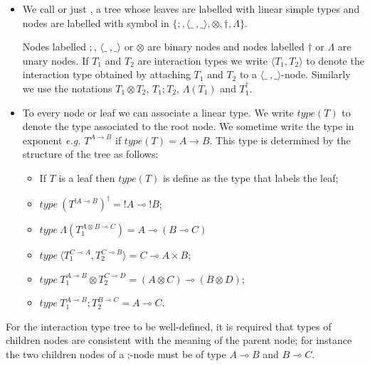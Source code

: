 \begin{definition} \hfill
\begin{itemize}
\item We call  or just ,
a tree whose leaves are labelled with linear simple types and
nodes are labelled with symbol in $\{ ;, \langle \_\ ,\_
\rangle, \otimes, \dagger, \Lambda \}$.


Nodes labelled $;$, $\langle \_\ ,\_ \rangle$ or $\otimes$ are
binary nodes and nodes labelled $\dagger$ or $\Lambda$ are unary
nodes. If $T_1$ and $T_2$ are interaction types we write
$\langle T_1, T_2 \rangle$ to denote the interaction type
obtained by attaching $T_1$ and $T_2$ to a $\langle \_\ ,\_
\rangle$-node. Similarly we use the notations $T_1 \otimes T_2$,
$T_1 ; T_2$, $\Lambda(T_1)$ and $T_1^\dagger$.

\item To every node or leaf we can associate a linear type. We write
    $type(T)$ to denote the type associated to the root node. We
    sometime write the type in exponent {\it e.g.}
    $T^{A\rightarrow B}$ if $type(T) =A\rightarrow B$. This type
    is determined by the structure of the tree as follows:
    \begin{itemize}
    \item If $T$ is a leaf then $type(T)$ is define as the type that labels the leaf;

    \item $type\ (T^{!A \multimap B})^\dagger = !A \multimap !B$;

    \item $type\ \Lambda(T_1^{A \otimes B \multimap C}) = A \multimap (B \multimap C)$

    \item $type\ \langle T_1^{C \multimap A} , T_2^{C \multimap B} \rangle =
    C \multimap A \times B$;

    \item $type\ T_1^{A \multimap B} \otimes T_2^{C \multimap D} = (A \otimes C) \multimap (B \otimes D)$;

    \item $type\ T_1^{A \multimap B};T_2^{B \multimap C} = A \multimap C$.
    \end{itemize}

\end{itemize}

For the interaction type tree to be well-defined, it is required
that types of children nodes are consistent with the meaning of the
parent node; for instance the two children nodes of a ;-node must be
of type $A\multimap B$ and $B\multimap C$.

\end{definition}


